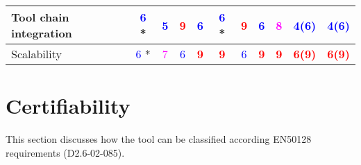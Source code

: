 \begin{tabular}{|l | c | c | c | c | c | c | c | c | c | c |}
\hline
Tool chain integration  & \textcolor{blue}{6} * & \textcolor{blue}{5} & \textcolor{red}{\textbf{9}} & \textcolor{blue}{6} & \textcolor{blue}{6} * & \textcolor{red}{\textbf{9}} & \textcolor{blue}{6} & \textcolor{magenta}{8} & \textcolor{blue}{4(6)}  & \textcolor{blue}{4(6)}  \\
\hline
Scalability  & \textcolor{blue}{6} * & \textcolor{magenta}{7} & \textcolor{blue}{6} & \textcolor{red}{\textbf{9}} & \textcolor{red}{\textbf{9}} & \textcolor{blue}{6} & \textcolor{red}{\textbf{9}} & \textcolor{red}{\textbf{9}} & \textcolor{red}{\textbf{6(9)}}  & \textcolor{red}{\textbf{6(9)}}  \\
\hline
\end{tabular}

\section{Certifiability}

This section discusses how the tool can be classified according EN50128 requirements (D2.6-02-085).


